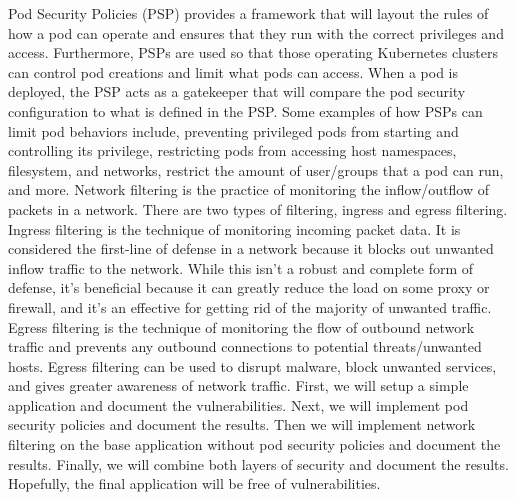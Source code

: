 Pod Security Policies (PSP) provides a framework that will layout the rules
of how a pod can operate and ensures that they run with the correct
privileges and access. Furthermore, PSPs are used so that those operating
Kubernetes clusters can control pod creations and limit what pods can access.
When a pod is deployed, the PSP acts as a gatekeeper that will compare the
pod security configuration to what is defined in the PSP. Some examples of how
PSPs can limit pod behaviors include, preventing privileged pods from starting
and controlling its privilege, restricting pods from accessing host namespaces,
filesystem, and networks, restrict the amount of user/groups that a pod can run,
and more.
Network filtering is the practice of monitoring the inflow/outflow of packets in
a network. There are two types of filtering, ingress and egress filtering.
Ingress filtering is the technique of monitoring incoming packet data.
It is considered the first-line of defense in a network because it blocks
out unwanted inflow traffic to the network. While this isn't a robust and complete
form of defense, it's beneficial because it can greatly reduce the load on some proxy
or firewall, and it's an effective for getting rid of the majority of unwanted traffic.
Egress filtering is the technique of monitoring the flow of outbound network traffic and
prevents any outbound connections to potential threats/unwanted hosts. Egress filtering
can be used to disrupt malware, block unwanted services, and gives greater awareness of
network traffic.
First, we will setup a simple application and document the vulnerabilities.
Next, we will implement pod security policies and document the results.
Then we will implement network filtering on the base application without pod security policies
and document the results. Finally, we will combine both layers of security and document the results.
Hopefully, the final application will be free of vulnerabilities.

